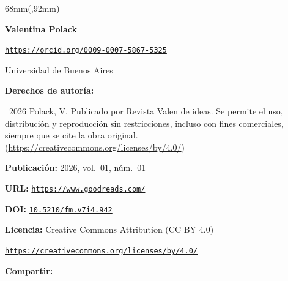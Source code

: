 \begin{textblock*}{68mm}(\gbbloquex,92mm)
{\setlength{\leftskip}{0pt}\setlength{\parindent}{0pt}%
\noindent\begin{minipage}[t]{68mm}
\sffamily\small\setlength{\parskip}{1pt}
{\bfseries\color{azulrevista}Valentina Polack}\par
{\scriptsize\texttt{\href{https://orcid.org/0009-0007-5867-5325}{https://orcid.org/0009-0007-5867-5325}}}\par
Universidad de Buenos Aires\par
\vspace{6pt}
{\bfseries\color{azulrevista!70}Derechos de autor\'ia:}\par
\textcopyright\ 2026 Polack, V. Publicado por Revista Valen de ideas. Se permite el uso, distribución y reproducción sin restricciones, incluso con fines comerciales, siempre que se cite la obra original. (\href{https://creativecommons.org/licenses/by/4.0/}{https://creativecommons.org/licenses/by/4.0/})\par\vspace{6pt}
{\bfseries\color{azulrevista!70}Publicación:} 2026, vol.~01, n\'um.~01\par\vspace{6pt}
{\bfseries\color{azulrevista!70}URL:} {\scriptsize\texttt{\href{https://www.goodreads.com/}{https://www.goodreads.com/}}}\par\vspace{6pt}
{\bfseries\color{azulrevista!70}DOI:} {\scriptsize\texttt{\href{https://doi.org/10.5210/fm.v7i4.942}{10.5210/fm.v7i4.942}}}\par\vspace{6pt}
{\bfseries\color{azulrevista!70}Licencia:} Creative Commons Attribution (CC BY 4.0)\par
{\scriptsize\texttt{\href{https://creativecommons.org/licenses/by/4.0/}{https://creativecommons.org/licenses/by/4.0/}}}\par
\vspace{6pt}
\vspace{6pt}
{\bfseries\color{azulrevista!70}Compartir:}\par\vspace{3pt}
{\large
\href{https://bsky.app/intent/compose?text=https%3A%2F%2Fwww.goodreads.com%2F}{}~
\href{mailto:?subject=Desigualdad%20digital%20y%20rendimiento%20acad%C3%A9mico%20en%20la%20educaci%C3%B3n%20superior%3A%20un%20estudio%20comparativo%20en%20universidades%20p%C3%BAblicas%20de%20Argentina%20y%20M%C3%A9xico&body=https%3A%2F%2Fwww.goodreads.com%2F}{}~
}
\end{minipage}}
\end{textblock*}
